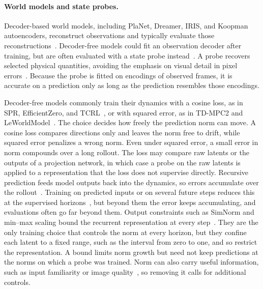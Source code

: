 \paragraph{World models and state probes.}
Decoder-based world models, including PlaNet, Dreamer, IRIS, and Koopman autoencoders, reconstruct observations and typically evaluate those reconstructions~\citep{Hafner2019Planet,hafner2020dream,Hafner2025,micheli2023transformers,Azencot2020}. Decoder-free models could fit an observation decoder after training, but are often evaluated with a state probe instead~\citep{Liu2026SemigroupJEPA,Radha2026UWMJEPA,terver2026what,zhou2025dinowmworldmodelspretrained}. A probe recovers selected physical quantities, avoiding the emphasis on visual detail in pixel errors~\citep{mathieu2016deep}. Because the probe is fitted on encodings of observed frames, it is accurate on a prediction only as long as the prediction resembles those encodings.

Decoder-free models commonly train their dynamics with a cosine loss, as in SPR, EfficientZero, and TCRL~\citep{Schwarzer2021SPR,ye2021mastering,zhao2023simplified}, or with squared error, as in TD-MPC2 and LeWorldModel~\citep{Hansen2023,maes2026leworldmodel}. The choice decides how freely the prediction norm can move. A cosine loss compares directions only and leaves the norm free to drift, while squared error penalizes a wrong norm. Even under squared error, a small error in norm compounds over a long rollout. The loss may compare raw latents or the outputs of a projection network, in which case a probe on the raw latents is applied to a representation that the loss does not supervise directly. Recursive prediction feeds model outputs back into the dynamics, so errors accumulate over the rollout~\citep{Talvitie2014,Kaiser2020,Janner2019}. Training on predicted inputs or on several future steps reduces this at the supervised horizons~\citep{Bengio2015ScheduledSampling,Venkatraman2015DaD,Lamb2016ProfessorForcing,Talvitie2017,Hafner2019Planet}, but beyond them the error keeps accumulating, and evaluations often go far beyond them. Output constraints such as SimNorm and min--max scaling bound the recurrent representation at every step~\citep{Hansen2023,Schrittwieser2020}. They are the only training choice that controls the norm at every horizon, but they confine each latent to a fixed range, such as the interval from zero to one, and so restrict the representation. A bound limits norm growth but need not keep predictions at the norms on which a probe was trained. Norm can also carry useful information, such as input familiarity or image quality~\citep{draganov2025norms,kim2022adaface}, so removing it calls for additional controls.

